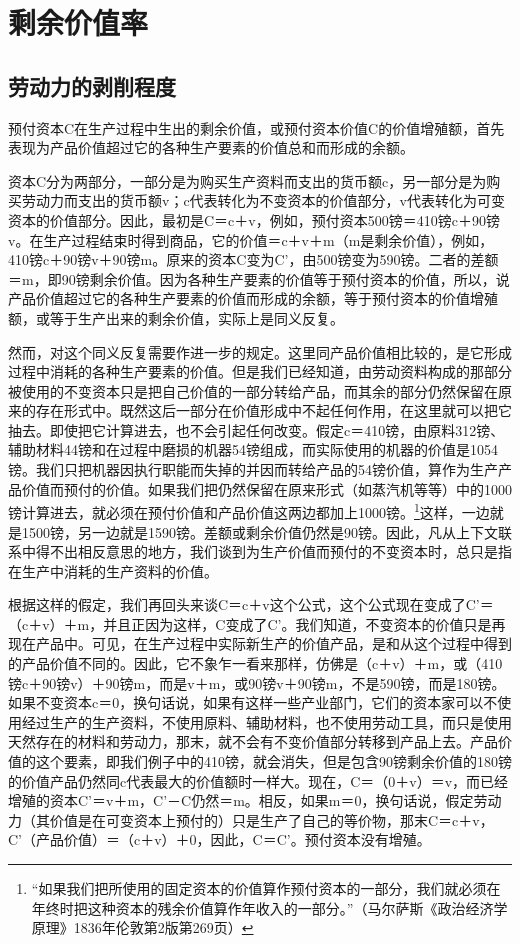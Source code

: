 \documentclass{ctexbook}
\begin{document}
\chapter{剩余价值率}

    \section{劳动力的剥削程度}

    预付资本C在生产过程中生出的剩余价值，或预付资本价值C的价值增殖额，首先表现为产品价值超过它的各种生产要素的价值总和而形成的余额。
    
    资本C分为两部分，一部分是为购买生产资料而支出的货币额c，另一部分是为购买劳动力而支出的货币额v；c代表转化为不变资本的价值部分，v代表转化为可变资本的价值部分。因此，最初是C＝c＋v，例如，预付资本500镑＝410镑c＋90镑v。在生产过程结束时得到商品，它的价值＝c＋v＋m（m是剩余价值），例如，410镑c＋90镑v＋90镑m。原来的资本C变为C'，由500镑变为590镑。二者的差额＝m，即90镑剩余价值。因为各种生产要素的价值等于预付资本的价值，所以，说产品价值超过它的各种生产要素的价值而形成的余额，等于预付资本的价值增殖额，或等于生产出来的剩余价值，实际上是同义反复。
    
    然而，对这个同义反复需要作进一步的规定。这里同产品价值相比较的，是它形成过程中消耗的各种生产要素的价值。但是我们已经知道，由劳动资料构成的那部分被使用的不变资本只是把自己价值的一部分转给产品，而其余的部分仍然保留在原来的存在形式中。既然这后一部分在价值形成中不起任何作用，在这里就可以把它抽去。即使把它计算进去，也不会引起任何改变。假定c＝410镑，由原料312镑、辅助材料44镑和在过程中磨损的机器54镑组成，而实际使用的机器的价值是1054镑。我们只把机器因执行职能而失掉的并因而转给产品的54镑价值，算作为生产产品价值而预付的价值。如果我们把仍然保留在原来形式（如蒸汽机等等）中的1000镑计算进去，就必须在预付价值和产品价值这两边都加上1000镑。\footnote{“如果我们把所使用的固定资本的价值算作预付资本的一部分，我们就必须在年终时把这种资本的残余价值算作年收入的一部分。”（马尔萨斯《政治经济学原理》1836年伦敦第2版第269页）}这样，一边就是1500镑，另一边就是1590镑。差额或剩余价值仍然是90镑。因此，凡从上下文联系中得不出相反意思的地方，我们谈到为生产价值而预付的不变资本时，总只是指在生产中消耗的生产资料的价值。
    
    根据这样的假定，我们再回头来谈C＝c＋v这个公式，这个公式现在变成了C'＝（c＋v）＋m，并且正因为这样，C变成了C'。我们知道，不变资本的价值只是再现在产品中。可见，在生产过程中实际新生产的价值产品，是和从这个过程中得到的产品价值不同的。因此，它不象乍一看来那样，仿佛是（c＋v）＋m，或（410镑c＋90镑v）＋90镑m，而是v＋m，或90镑v＋90镑m，不是590镑，而是180镑。如果不变资本c＝0，换句话说，如果有这样一些产业部门，它们的资本家可以不使用经过生产的生产资料，不使用原料、辅助材料，也不使用劳动工具，而只是使用天然存在的材料和劳动力，那末，就不会有不变价值部分转移到产品上去。产品价值的这个要素，即我们例子中的410镑，就会消失，但是包含90镑剩余价值的180镑的价值产品仍然同c代表最大的价值额时一样大。现在，C＝（0＋v）＝v，而已经增殖的资本C'＝v＋m，C'－C仍然＝m。相反，如果m＝0，换句话说，假定劳动力（其价值是在可变资本上预付的）只是生产了自己的等价物，那末C＝c＋v，C'（产品价值）＝（c＋v）＋0，因此，C＝C'。预付资本没有增殖。
    
\end{document}

